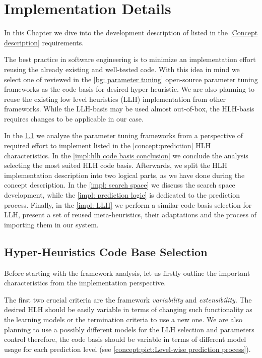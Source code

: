 \chapter{Implementation Details}
In this Chapter we dive into the development description of listed in the \cref{Concept description} requirements.
 
The best practice in software engineering is to minimize an implementation effort reusing the already existing and well-tested code. With this idea in mind we select one of reviewed in the \cref{bg: parameter tuning} open-source parameter tuning frameworks as the code basis for desired hyper-heuristic. We are also planning to reuse the existing low level heuristics (LLH) implementation from other frameworks. While the LLH-basis may be used almost out-of-box, the HLH-basis requires changes to be applicable in our case.

In the \cref{impl:hlh code basis section} we analyze the parameter tuning frameworks from a perspective of required effort to implement listed in the \cref{concept:prediction} HLH characteristics. In the \cref{impl:hlh code basis conclusion} we conclude the analysis selecting the most suited HLH code basis. Afterwards, we split the HLH implementation description into two logical parts, as we have done during the concept description. In the \cref{impl: search space} we discuss the search space development, while the \cref{impl: prediction logic} is dedicated to the prediction process. Finally, in the \cref{impl: LLH} we perform a similar code basis selection for LLH, present a set of reused meta-heuristics, their adaptations and the process of importing them in our system.


\section{Hyper-Heuristics Code Base Selection}\label{impl:hlh code basis section}
Before starting with the framework analysis, let us firstly outline the important characteristics from the implementation perspective.

The first two crucial criteria are the framework \emph{variability} and \emph{extensibility}. The desired HLH should be easily variable in terms of changing such functionality as the learning models or the termination criteria to use a new one. We are also planning to use a possibly different models for the LLH selection and parameters control therefore, the code basis should be variable in terms of different model usage for each prediction level (see \cref{concept:pict:Level-wise prediction process}).

